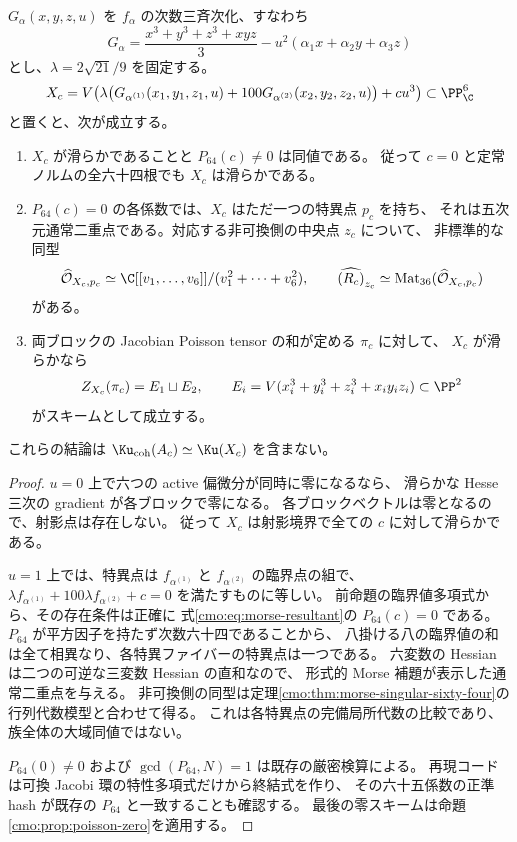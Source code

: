 \begin{theorem}[判別集合と局所節点が一致する可換候補]
\label{cmo:thm:commutative-discriminant-candidate}
$G_\alpha(x,y,z,u)$ を $f_\alpha$ の次数三斉次化、すなわち
\[
 G_\alpha=\frac{x^3+y^3+z^3+xyz}{3}
              -u^2(\alpha_1x+\alpha_2y+\alpha_3z)
\]
とし、$\lambda=2\sqrt{21}/9$ を固定する。
\begin{equation}\label{cmo:eq:commutative-candidate}
 X_c=V\!\left(\lambda\bigl(G_{\alpha^{(1)}}(x_1,y_1,z_1,u)
            +100G_{\alpha^{(2)}}(x_2,y_2,z_2,u)\bigr)+cu^3\right)
       \subset\PP^6_\C
\end{equation}
と置くと、次が成立する。
\begin{enumerate}
\item $X_c$ が滑らかであることと $P_{64}(c)\ne0$ は同値である。
      従って $c=0$ と定常ノルムの全六十四根でも $X_c$ は滑らかである。
\item $P_{64}(c)=0$ の各係数では、$X_c$ はただ一つの特異点 $p_c$ を持ち、
      それは五次元通常二重点である。対応する非可換側の中央点 $z_c$ について、
      非標準的な同型
      \[
       \widehat{\mathcal O}_{X_c,p_c}
          \simeq\C[[v_1,\ldots,v_6]]/(v_1^2+\cdots+v_6^2),\qquad
       \widehat{(R_c)}_{z_c}
          \simeq\operatorname{Mat}_{36}(\widehat{\mathcal O}_{X_c,p_c})
      \]
      がある。
\item 両ブロックの Jacobian Poisson tensor の和が定める $\pi_c$ に対して、
      $X_c$ が滑らかなら
      \[
       Z_{X_c}(\pi_c)=E_1\sqcup E_2,\qquad
       E_i=V(x_i^3+y_i^3+z_i^3+x_iy_iz_i)\subset\PP^2
      \]
      がスキームとして成立する。
\end{enumerate}
これらの結論は $\Ku_{\mathrm{coh}}(A_c)\simeq\Ku(X_c)$ を含まない。
\end{theorem}
\begin{proof}
$u=0$ 上で六つの active 偏微分が同時に零になるなら、
滑らかな Hesse 三次の gradient が各ブロックで零になる。
各ブロックベクトルは零となるので、射影点は存在しない。
従って $X_c$ は射影境界で全ての $c$ に対して滑らかである。

$u=1$ 上では、特異点は $f_{\alpha^{(1)}}$ と
$f_{\alpha^{(2)}}$ の臨界点の組で、
$\lambda f_{\alpha^{(1)}}+100\lambda f_{\alpha^{(2)}}+c=0$
を満たすものに等しい。
前命題の臨界値多項式から、その存在条件は正確に
式\eqref{cmo:eq:morse-resultant}の $P_{64}(c)=0$ である。
$P_{64}$ が平方因子を持たず次数六十四であることから、
八掛ける八の臨界値の和は全て相異なり、各特異ファイバーの特異点は一つである。
六変数の Hessian は二つの可逆な三変数 Hessian の直和なので、
形式的 Morse 補題が表示した通常二重点を与える。
非可換側の同型は定理\ref{cmo:thm:morse-singular-sixty-four}の
行列代数模型と合わせて得る。
これは各特異点の完備局所代数の比較であり、族全体の大域同値ではない。

$P_{64}(0)\ne0$ および $\gcd(P_{64},N)=1$ は既存の厳密検算による。
再現コードは可換 Jacobi 環の特性多項式だけから終結式を作り、
その六十五係数の正準 hash が既存の $P_{64}$ と一致することも確認する。
最後の零スキームは命題\ref{cmo:prop:poisson-zero}を適用する。
\end{proof}


